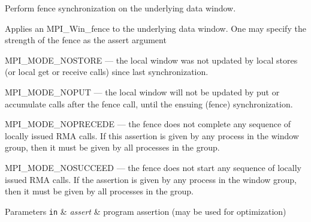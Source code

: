 Perform fence synchronization on the underlying data window. 

Applies an {\ttfamily M\+P\+I\+\_\+\+Win\+\_\+fence} to the underlying data window. One may specify the strength of the fence as the {\ttfamily assert} argument

{\ttfamily M\+P\+I\+\_\+\+M\+O\+D\+E\+\_\+\+N\+O\+S\+T\+O\+RE} --- the local window was not updated by local stores (or local get or receive calls) since last synchronization.

{\ttfamily M\+P\+I\+\_\+\+M\+O\+D\+E\+\_\+\+N\+O\+P\+UT} --- the local window will not be updated by put or accumulate calls after the fence call, until the ensuing (fence) synchronization.

{\ttfamily M\+P\+I\+\_\+\+M\+O\+D\+E\+\_\+\+N\+O\+P\+R\+E\+C\+E\+DE} --- the fence does not complete any sequence of locally issued R\+MA calls. If this assertion is given by any process in the window group, then it must be given by all processes in the group.

{\ttfamily M\+P\+I\+\_\+\+M\+O\+D\+E\+\_\+\+N\+O\+S\+U\+C\+C\+E\+ED} --- the fence does not start any sequence of locally issued R\+MA calls. If the assertion is given by any process in the window group, then it must be given by all processes in the group.


\begin{DoxyParams}[1]{Parameters}
\mbox{\tt in}  & {\em assert} & program assertion (may be used for optimization) \\
\hline
\end{DoxyParams}
\mbox{\label{structvt_1_1rdma_1_1_handle_3_01_t_00_01_e_00_01_index_t_00_01typename_01std_1_1enable__if__t_3_d15dac1b5db6e2bc0fb0b8aca42b1456_ad5a344cce3e66668c659bb69ee74c5e3}} 
